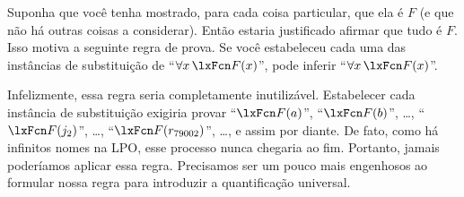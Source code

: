 Suponha que você tenha mostrado, para cada coisa particular, que ela é $F$ (e que não há outras coisas a considerar). Então estaria justificado afirmar que tudo é $F$. Isso motiva a seguinte regra de prova. Se você estabeleceu cada uma das instâncias de substituição de \textquotedblleft $\forall x\,\atom{F}{x}$\textquotedblright{}, pode inferir \textquotedblleft $\forall x\,\atom{F}{x}$\textquotedblright{}.

Infelizmente, essa regra seria completamente inutilizável. Estabelecer cada instância de substituição exigiria provar \textquotedblleft $\atom{F}{a}$\textquotedblright{}, \textquotedblleft $\atom{F}{b}$\textquotedblright{}, \dots, \textquotedblleft $\atom{F}{j_2}$\textquotedblright{}, \dots, \textquotedblleft $\atom{F}{r_{79002}}$\textquotedblright{}, \ldots, e assim por diante. De fato, como há infinitos nomes na LPO, esse processo nunca chegaria ao fim. Portanto, jamais poderíamos aplicar essa regra. Precisamos ser um pouco mais engenhosos ao formular nossa regra para introduzir a quantificação universal.

